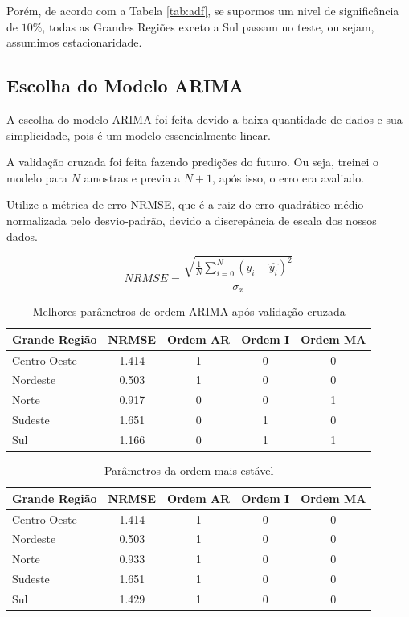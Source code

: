 \documentclass[12pt]{article}
\begin{document}
Porém, de acordo com a Tabela \ref{tab:adf}, se supormos um nivel
de significância de $10\%$, todas as Grandes Regiões exceto a Sul passam no
teste, ou sejam, assumimos estacionaridade.

\label{ss:arima}
\subsection{Escolha do Modelo ARIMA}

A escolha do modelo ARIMA foi feita devido a baixa quantidade de dados e sua
simplicidade, pois é um modelo essencialmente linear.

A validação cruzada foi feita fazendo predições do futuro. Ou seja, treinei
o modelo para $N$ amostras e previa a $N+1$, após isso, o erro era avaliado.

Utilize a métrica de erro NRMSE, que é a raiz do erro quadrático médio
normalizada pelo desvio-padrão, devido a discrepância de escala dos nossos
dados.

\begin{equation}
    NRMSE = \frac{\sqrt{\frac{1}{N}\sum_{i=0}^{N} (y_i - \hat{y_i})^2}}{\sigma_x}
\end{equation}


\begin{table}[h!]
\centering
\caption{Melhores parâmetros de ordem ARIMA após validação cruzada}
\label{tab:arima_performance}
\begin{tabular}{lcccc}
\toprule
\textbf{Grande Região} & \textbf{NRMSE} & \textbf{Ordem AR} & \textbf{Ordem I} & \textbf{Ordem MA} \\
\midrule
Centro-Oeste  & 1.414 & 1 & 0 & 0 \\
Nordeste  & 0.503 & 1 & 0 & 0 \\
Norte  & 0.917 & 0 & 0 & 1 \\
Sudeste  & 1.651 & 0 & 1 & 0 \\
Sul  & 1.166 & 0 & 1 & 1 \\
\bottomrule
\end{tabular}
\end{table}

\begin{table}[h!]
\centering
\caption{Parâmetros da ordem mais estável}
\label{tab:arima_stable}
\begin{tabular}{lcccc}
\toprule
\textbf{Grande Região} & \textbf{NRMSE} & \textbf{Ordem AR} & \textbf{Ordem I} & \textbf{Ordem MA} \\
\midrule
Centro-Oeste  & 1.414 & 1 & 0 & 0 \\
Nordeste  & 0.503 & 1 & 0 & 0 \\
Norte  & 0.933 & 1 & 0 & 0 \\
Sudeste  & 1.651 & 1 & 0 & 0 \\
Sul  & 1.429 & 1 & 0 & 0 \\
\bottomrule
\end{tabular}
\end{table}
\end{document}
